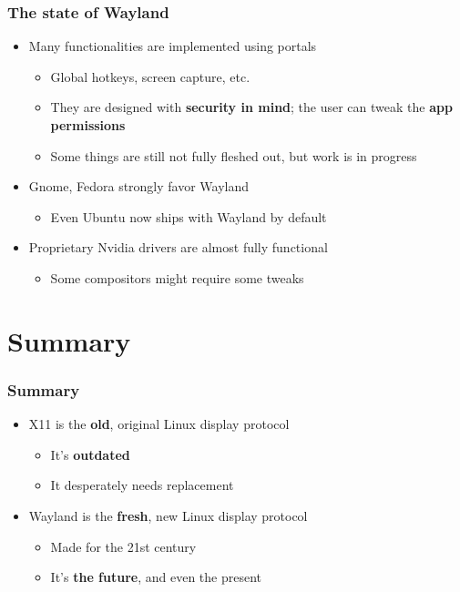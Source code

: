 \documentclass{beamer}
\begin{document}
\begin{frame}
  \frametitle{The state of Wayland}
  \begin{itemize}
    \item Many functionalities are implemented using portals
    \begin{itemize}
      \item Global hotkeys, screen capture, etc.
      \item They are designed with \textbf{security in mind}; the user can tweak the \textbf{app permissions}
      \item Some things are still not fully fleshed out, but work is in progress
    \end{itemize}
    \item Gnome, Fedora strongly favor Wayland
    \begin{itemize}
      \item Even Ubuntu now ships with Wayland by default
    \end{itemize}
    \item Proprietary Nvidia drivers are almost fully functional
    \begin{itemize}
      \item Some compositors might require some tweaks
    \end{itemize}
  \end{itemize}
\end{frame}

\section{Summary}
\begin{frame}
  \frametitle{Summary}
  \begin{itemize}
    \item X11 is the \textbf{old}, original Linux display protocol
    \begin{itemize}
      \item It's \textbf{outdated}
      \item It desperately needs replacement
    \end{itemize}
    \item Wayland is the \textbf{fresh}, new Linux display protocol
    \begin{itemize}
      \item Made for the 21st century
      \item It's \textbf{the future}, and even the present
    \end{itemize}
  \end{itemize}
\end{frame}
\end{document}
